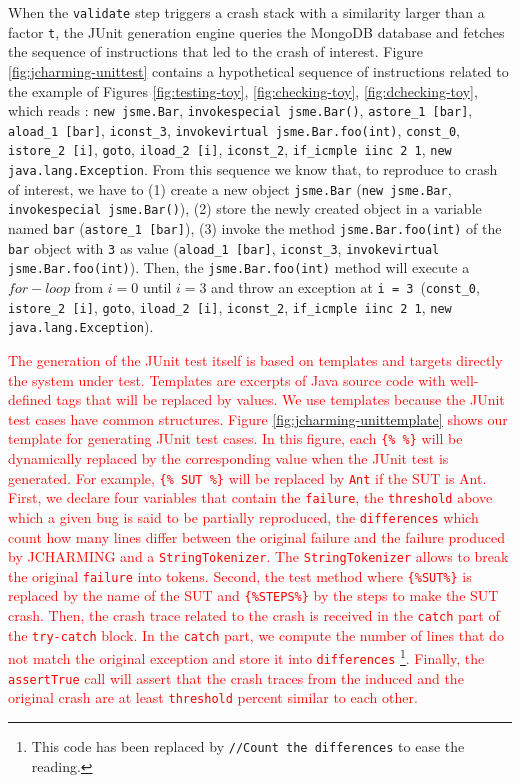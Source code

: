 \documentclass[times, doublespace]{smrauth}
\newcommand{\red}[1]{\textcolor{red}{#1}}
\begin{document}
{When the {\tt validate} step triggers a crash stack with a similarity larger than a factor {\tt t}, the JUnit generation engine queries the MongoDB database and fetches the sequence of instructions that led to the crash of interest.
Figure \ref{fig:jcharming-unittest} contains a hypothetical sequence
of instructions related to the example of Figures \ref{fig:testing-toy},
\ref{fig:checking-toy}, \ref{fig:dchecking-toy}, which reads : {\tt new jsme.Bar},
 {\tt invokespecial jsme.Bar()}, {\tt astore\_1 [bar]}, {\tt aload\_1 [bar]},
  {\tt iconst\_3}, {\tt invokevirtual jsme.Bar.foo(int)}, {\tt const\_0},
  {\tt istore\_2 [i]}, {\tt goto}, {\tt iload\_2 [i]}, {\tt iconst\_2},
  {\tt if\_icmple iinc 2 1}, {\tt new java.lang.Exception}.
From this sequence we know that, to reproduce to crash of interest, we have
to (1) create a new object {\tt jsme.Bar} ({\tt new jsme.Bar},
{\tt invokespecial jsme.Bar()}), (2) store the newly created object in a
variable named {\tt bar} ({\tt astore\_1 [bar]}), (3) invoke the method
{\tt jsme.Bar.foo(int)} of the {\tt bar} object with {\tt 3} as value
({\tt aload\_1 [bar]}, {\tt iconst\_3}, {\tt invokevirtual jsme.Bar.foo(int)}).
Then, the {\tt jsme.Bar.foo(int)} method will execute a $for-loop$ from $i=0$ until $i=3$ and
throw an exception at {\tt i = 3}~({\tt const\_0}, {\tt istore\_2 [i]}, {\tt goto},
{\tt iload\_2 [i]}, {\tt iconst\_2}, {\tt if\_icmple iinc 2 1}, {\tt new java.lang.Exception}).

\red{The generation of the JUnit test itself is based on templates and targets directly
the system under test. Templates are excerpts of Java source code with well-defined
tags that will be replaced by values. We use templates because the
JUnit test cases have common structures.
Figure \ref{fig:jcharming-unittemplate} shows our template for generating JUnit
test cases. In this figure, each {\tt \{\% \%\}} will be dynamically replaced by
the corresponding value when the JUnit test is generated. For example, {\tt \{\% SUT \%\}}
will be replaced by {\tt Ant} if the SUT is Ant.
First, we declare four variables that contain the {\tt failure},
the {\tt threshold} above which a given bug is said to be partially reproduced,
the {\tt differences} which count how many lines differ between the original
failure and the failure produced by JCHARMING and a {\tt StringTokenizer}.
The {\tt StringTokenizer} allows to break the original {\tt failure} into
tokens. Second, the test method where {\tt \{\%SUT\%\}} is replaced by the name
of the SUT and {\tt \{\%STEPS\%\}} by the steps to make the SUT crash.
Then, the crash trace related to the crash is received in the {\tt catch} part of
the {\tt try-catch} block. In the {\tt catch} part, we compute the number of lines
that do not match the original exception and store it into {\tt differences}
\footnote{This code has been replaced by {\tt //Count the differences} to ease the
reading.}. Finally, the {\tt assertTrue} call will assert that
the crash traces from the induced and the original crash are at least {\tt threshold}
 percent similar to each other.}


}
\end{document}

